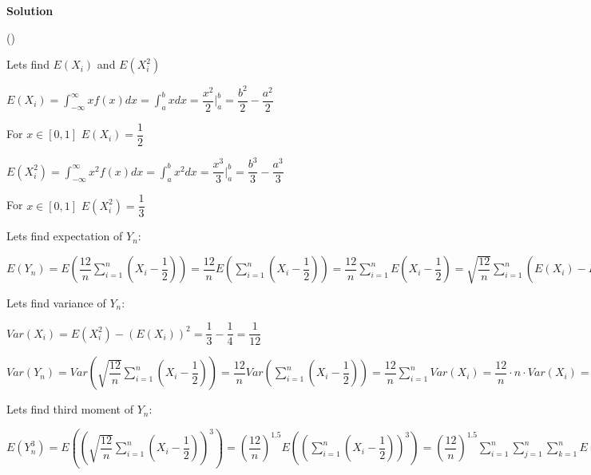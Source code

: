 \documentclass[12pt]{article}
\begin{document}
\textbf{Solution}
\begin{list}{()~}{}
\item Lets find $E\left(X_i\right)$ and $E\left(X_i^2\right)$

$E\left(X_i\right)=\int_{-\infty}^{\infty}xf\left(x\right)dx=\int_{a}^{b}xdx=\dfrac{x^2}{2}\vert_a^b=\dfrac{b^2}{2}-\dfrac{a^2}{2}$

For $x \in \left[0, 1\right]$ $E\left(X_i\right)=\dfrac{1}{2}$

$E\left(X_i^2\right)=\int_{-\infty}^{\infty}x^2f\left(x\right)dx = \int_{a}^{b}x^2dx = \dfrac{x^3}{3}\vert_a^b=\dfrac{b^3}{3}-\dfrac{a^3}{3}$

For $x \in \left[0, 1\right]$ $E\left(X_i^2\right)=\dfrac{1}{3}$

\medskip

Lets find expectation of $Y_n$:

$E\left(Y_n\right)=E\left(\dfrac{12}{n}\sum_{i = 1}^n\left(X_i-\dfrac{1}{2}\right)\right)=\dfrac{12}{n}E\left(\sum_{i=1}^n\left(X_i-\dfrac{1}{2}\right)\right)=\dfrac{12}{n}\sum_{i=1}^nE\left(X_i-\dfrac{1}{2}\right)=\sqrt{\dfrac{12}{n}}\sum_{i = 1}^n\left(E\left(X_i\right)-E\left(\dfrac{1}{2}\right)\right)=\sqrt{\dfrac{12}{n}}\sum_{i = 1}^n\left(\dfrac{1}{2}-\dfrac{1}{2}\right) = 0$

\medskip

Lets find variance of $Y_n$:

$Var(X_i) = E\left(X_i^2\right) - \left(E\left(X_i\right)\right)^2 = \dfrac{1}{3}-\dfrac{1}{4} = \dfrac{1}{12}$

$Var\left(Y_n\right) = Var\left(\sqrt{\dfrac{12}{n}}\sum_{i=1}^n\left(X_i-\dfrac{1}{2}\right)\right)=\dfrac{12}{n}Var\left(\sum_{i=1}^n\left(X_i-\dfrac{1}{2}\right)\right)=\dfrac{12}{n}\sum_{i=1}^n Var\left(X_i\right) = \dfrac{12}{n}\cdot n\cdot Var\left(X_i\right) = \dfrac{12}{n}\cdot \dfrac{1}{12}\cdot n = 1$

\medskip

Lets find third moment of $Y_n$:

$E\left(Y_n^3\right)=E\left(\left(\sqrt{\dfrac{12}{n}}\sum_{i=1}^n\left(X_i-\dfrac{1}{2}\right)\right)^3\right)=\left(\dfrac{12}{n}\right)^{1.5}E\left(\left(\sum_{i=1}^n\left(X_i-\dfrac{1}{2}\right)\right)^3\right)=\left(\dfrac{12}{n}\right)^{1.5} \sum_{i = 1}^n\sum_{j = 1}^n\sum_{k = 1}^n E\left(X_i-\dfrac{1}{2}\right)\left(X_j-\dfrac{1}{2}\right)\left(X_k-\dfrac{1}{2}\right)=\left(\dfrac{12}{n}\right)^{1.5}\left(E\left(X_i-\dfrac{1}{2}\right)\right)^3=\left(\dfrac{12}{n}\right)^{1.5}\left(E\left(X_i\right)-E\left(\dfrac{1}{2}\right)\right) = \left(\dfrac{12}{n}\right)^{1.5} \cdot 0 = 0$


\end{list}
\end{document}
